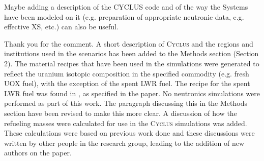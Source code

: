 \documentclass[answers,11pt]{exam}
\newcommand{\Cyclus}{\textsc{Cyclus}\xspace}%
\begin{document}
\begin{questions}
        \question Maybe adding a description of the CYCLUS code and of the way 
        the Systems have been modeled on it (e.g. preparation of appropriate 
        neutronic data, e.g. effective XS, etc.) can also be useful.
        \begin{solution}
                Thank you for the comment. A short description of \Cyclus and the 
                regions and institutions used in the scenarios has 
                been added to the Methods section (Section 2). 
                The material recipes that have been used 
                in the simulations were generated to reflect the uranium isotopic 
                composition in the specified commodity (e.g. fresh UOX fuel), with 
                the exception of the spent \gls{LWR} fuel. The recipe for the spent 
                \gls{LWR} fuel 
                was found in \cite{yacout_visionverifiable_2006}, as specified in 
                the paper. No neutronics simulations were performed as part of this 
                work. The paragraph discussing this in the Methods section have been 
                revised to make this more clear. A discussion of how the refueling 
                masses were calculated for use in the \Cyclus simulations was added.
                These calculations were based on previous work done and these 
                discussions were written by other people in the research group, leading 
                to the addition of new authors on the paper. 
        \end{solution}

\end{questions}


\end{document}
